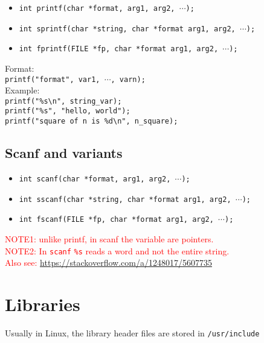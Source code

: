 \begin{multicols*}{3}
\begin{itemize}
\item \texttt{int printf(char *format, arg1, arg2, $\cdots$);}
\item \texttt{int sprintf(char *string, char *format arg1, arg2, $\cdots$);}
\item \texttt{int fprintf(FILE *fp, char *format arg1, arg2, $\cdots$);}
\end{itemize}

Format:\\
\texttt{printf("format", var1, $\cdots$, varn);}\\
Example:\\
\texttt{printf("\%s\textbackslash n", string\_var);}\\
\texttt{printf("\%s", "hello, world");}\\
\texttt{printf("square of n is \%d\textbackslash n", n\_square);}\\

\subsection{Scanf and variants}

\begin{itemize}
\item \texttt{int scanf(char *format, arg1, arg2, $\cdots$);}
\item \texttt{int sscanf(char *string, char *format arg1, arg2, $\cdots$);}
\item \texttt{int fscanf(FILE *fp, char *format arg1, arg2, $\cdots$);}
\end{itemize}

\textcolor{red}{NOTE1: unlike printf, in scanf the variable are pointers.}\\
\textcolor{red}{NOTE2: In \texttt{scanf} \texttt{\%s} reads a word and not the entire string.}\\
\textcolor{red}{Also see:} \textcolor{blue}{\url{https://stackoverflow.com/a/1248017/5607735}}\\

\vfill\null
\columnbreak


\section{Libraries}
Usually in Linux, the library header files are stored in \texttt{/usr/include}\\


\end{multicols*}
